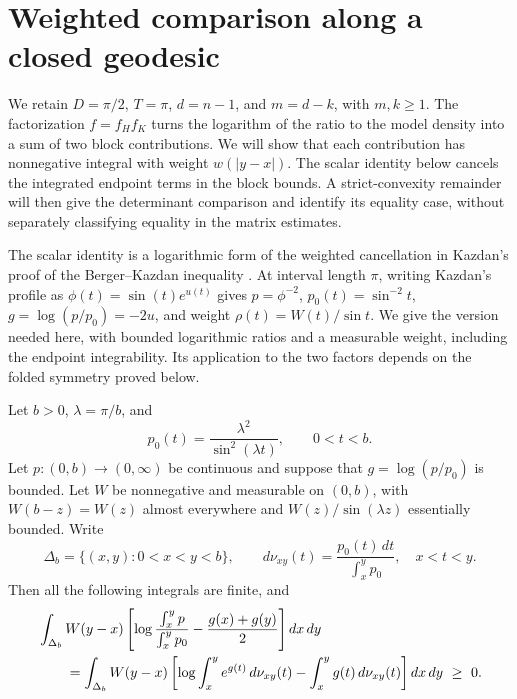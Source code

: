 \section{Weighted comparison along a closed geodesic}
\label{weighted:section}

We retain $D=\pi/2$, $T=\pi$, $d=n-1$, and $m=d-k$, with
$m,k\geq1$. The factorization $f=f_Hf_K$ turns the logarithm of
the ratio to the model density into a sum of two block contributions.
We will show that each contribution has nonnegative integral with
weight $w(|y-x|)$. The scalar identity below cancels the integrated
endpoint terms in the block bounds. A strict-convexity remainder
will then give the determinant comparison and identify its equality
case, without separately classifying equality in the matrix estimates.

The scalar identity is a logarithmic form of the weighted cancellation
in Kazdan's proof of the Berger--Kazdan inequality
\citep[Appendix~E, especially E.4--E.8]{Kazdan1978AppendixE}.
At interval length $\pi$, writing Kazdan's profile as
$\phi(t)=\sin(t)e^{u(t)}$ gives $p=\phi^{-2}$,
$p_0(t)=\sin^{-2}t$, $g=\log(p/p_0)=-2u$, and weight
$\rho(t)=W(t)/\sin t$.
We give the version needed here, with bounded logarithmic ratios
and a measurable weight, including the endpoint integrability.
Its application to the two factors depends on the folded symmetry
proved below.

\begin{lemma}\label{weighted:scalar}
Let $b>0$, $\lambda=\pi/b$, and
\[
 p_0(t)=\frac{\lambda^2}{\sin^2(\lambda t)},\qquad 0<t<b.
\]
Let $p:(0,b)\to(0,\infty)$ be continuous and suppose that
$g=\log(p/p_0)$ is bounded.  Let $W$ be nonnegative and measurable on
$(0,b)$, with $W(b-z)=W(z)$ almost everywhere and
$W(z)/\sin(\lambda z)$ essentially bounded.  Write
\[
 \Delta_b=\{(x,y):0<x<y<b\},\qquad
 d\nu_{xy}(t)=\frac{p_0(t)\,dt}{\int_x^y p_0},\quad x<t<y.
\]
Then all the following integrals are finite, and
\begin{align}
 &\int_{\Delta_b}W(y-x)
 \left[\log\frac{\int_x^y p}{\int_x^y p_0}
       -\frac{g(x)+g(y)}2\right]dx\,dy \notag\\
 &\qquad=\int_{\Delta_b}W(y-x)
 \left[\log\int_x^y e^{g(t)}\,d\nu_{xy}(t)
       -\int_x^y g(t)\,d\nu_{xy}(t)\right]dx\,dy
 \ \geq\ 0.\label{weighted:scalar-identity}
\end{align}
\end{lemma}

